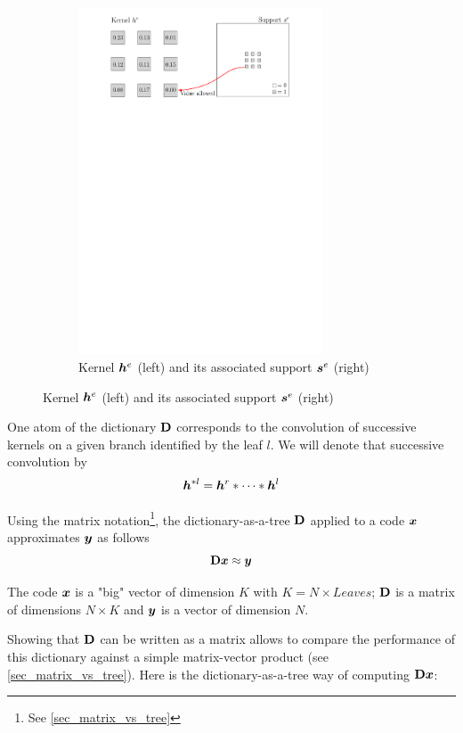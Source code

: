 \begin{figure}[!ht]
\begin{subfigure}[b]{0.79\textwidth}
\includegraphics[width=0.80\textwidth]{figures/kernel-h_e.pdf}
\caption{Kernel $\bm{h}^e$ (left) and its associated support $\bm{s}^e$ (right)}\label{fig_example_kernel}
\end{subfigure}
\end{figure}

One atom of the dictionary $\mathbf{D}$ corresponds to the convolution of successive kernels on a given branch identified by the leaf $l$. We will denote that successive convolution by
$$\bm{h}^{*l} = \bm{h}^r * \dots * \bm{h}^l$$

Using the matrix notation\footnote{See \cref{sec_matrix_vs_tree}}, the dictionary-as-a-tree $\mathbf{D}$ applied to a code $\bm{x}$ approximates $\bm{y}$ as follows
$$\mathbf{D}\bm{x} \approx \bm{y}$$

The code $\bm{x}$ is a "big" vector of dimension $K$ with $K = N \times Leaves$; $\mathbf{D}$ is a matrix of dimensions $N \times K$ and $\bm{y}$ is a vector of dimension $N$. 

Showing that $\mathbf{D}$ can be written as a matrix allows to compare the performance of this dictionary against a simple matrix-vector product (see \cref{sec_matrix_vs_tree}). Here is the dictionary-as-a-tree way of computing $\mathbf{D}\bm{x}$:


